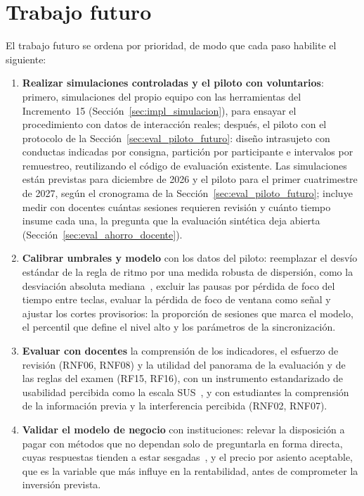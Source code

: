 \section{Trabajo futuro}
\label{sec:concl_trabajo_futuro}

El trabajo futuro se ordena por prioridad, de modo que cada paso habilite el siguiente:

\begin{enumerate}
    \item \textbf{Realizar simulaciones controladas y el piloto con voluntarios}: primero, simulaciones del propio equipo con las herramientas del Incremento~15 (Sección~\ref{sec:impl_simulacion}), para ensayar el procedimiento con datos de interacción reales; después, el piloto con el protocolo de la Sección~\ref{sec:eval_piloto_futuro}: diseño intrasujeto con conductas indicadas por consigna, partición por participante e intervalos por remuestreo, reutilizando el código de evaluación existente. Las simulaciones están previstas para diciembre de 2026 y el piloto para el primer cuatrimestre de 2027, según el cronograma de la Sección~\ref{sec:eval_piloto_futuro}; incluye medir con docentes cuántas sesiones requieren revisión y cuánto tiempo insume cada una, la pregunta que la evaluación sintética deja abierta (Sección~\ref{sec:eval_ahorro_docente}).
    \item \textbf{Calibrar umbrales y modelo} con los datos del piloto: reemplazar el desvío estándar de la regla de ritmo por una medida robusta de dispersión, como la desviación absoluta mediana~\parencite{Leys2013}, excluir las pausas por pérdida de foco del tiempo entre teclas, evaluar la pérdida de foco de ventana como señal y ajustar los cortes provisorios: la proporción de sesiones que marca el modelo, el percentil que define el nivel alto y los parámetros de la sincronización.
    \item \textbf{Evaluar con docentes} la comprensión de los indicadores, el esfuerzo de revisión (RNF06, RNF08) y la utilidad del panorama de la evaluación y de las reglas del examen (RF15, RF16), con un instrumento estandarizado de usabilidad percibida como la escala SUS~\parencite{Bangor2008}, y con estudiantes la comprensión de la información previa y la interferencia percibida (RNF02, RNF07).
    \item \textbf{Validar el modelo de negocio} con instituciones: relevar la disposición a pagar con métodos que no dependan solo de preguntarla en forma directa, cuyas respuestas tienden a estar sesgadas~\parencite{Breidert2006}, y el precio por asiento aceptable, que es la variable que más influye en la rentabilidad, antes de comprometer la inversión prevista.

\end{enumerate}
